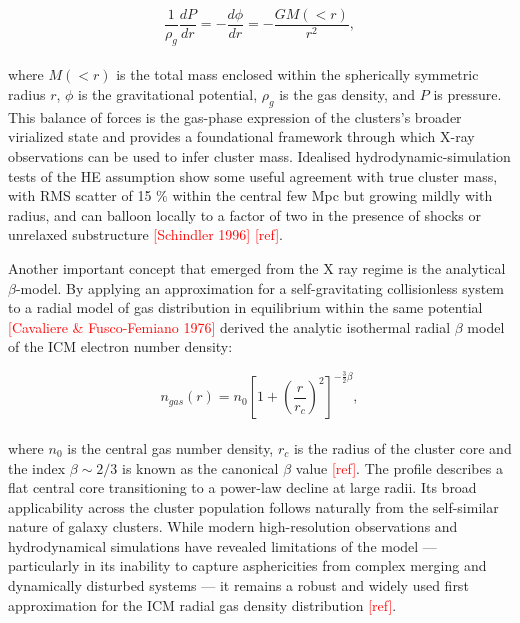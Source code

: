\begin{equation}
	\frac{1}{\rho_g}\frac{dP}{dr} = -\frac{d\phi}{dr} = 
	-\frac{GM(<r)}{r^2},
	\label{eq:HE}
\end{equation}
\\
where $M(<r)$ is the total mass enclosed within the spherically symmetric radius $r$, $\phi$ is the gravitational potential, $\rho_g$ is the gas density, and $P$ is pressure. This balance of forces is the gas-phase expression of the clusters's broader virialized state and provides a foundational framework through which X-ray observations can be used to infer cluster mass.  Idealised hydrodynamic-simulation tests of the HE assumption show some useful agreement with true cluster mass, with RMS scatter of 15 $\%$ within the central few Mpc but growing mildly with radius, and can balloon locally to a factor of two in the presence of shocks or unrelaxed substructure  \textcolor{red}{[Schindler 1996]} \textcolor{red}{[ref]}. %

\newpage
Another important concept that emerged from the X ray regime is the analytical $\beta$-model. By applying an approximation for a self-gravitating collisionless system to a radial model of gas distribution in equilibrium within the same potential \textcolor{red}{[Cavaliere \& Fusco-Femiano 1976]} derived the analytic isothermal radial $\beta$ model of the ICM electron number density:

\begin{equation}
n_{gas}(r) = n_0 \left[ 1 + \left( \frac{r}{r_c} \right)^2 \right]^{-\frac{3}{2}\beta},
	\label{eq:3DradialBeta}
\end{equation}
\\
where $n_0$ is the central gas number density, $r_{c}$ is the radius of the cluster core and the index $\beta \sim 2/3$ is known as the canonical $\beta$ value \textcolor{red}{[ref]}. The profile describes a flat central core transitioning to a power-law decline at large radii. Its broad applicability across the cluster population follows naturally from the self-similar nature of galaxy clusters. While modern high-resolution observations and hydrodynamical simulations have revealed limitations of the model — particularly in its inability to capture asphericities from complex merging and dynamically disturbed systems — it remains a robust and widely used first approximation for the ICM radial gas density distribution \textcolor{red}{[ref]}. 

